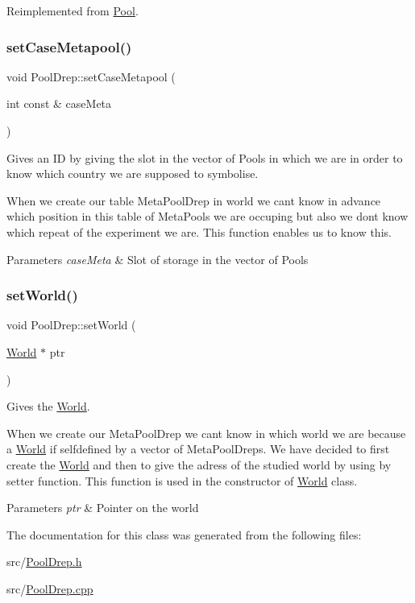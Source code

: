 Reimplemented from \hyperlink{class_pool_ad497f611cb592a6dd13f07b217bfd350}{Pool}.

\hypertarget{class_pool_drep_a64f409df1a7815bebc4744472ec7b8ce}{}\label{class_pool_drep_a64f409df1a7815bebc4744472ec7b8ce} 
\subsubsection{\texorpdfstring{set\+Case\+Metapool()}{setCaseMetapool()}}
{\footnotesize\ttfamily void Pool\+Drep\+::set\+Case\+Metapool (\begin{DoxyParamCaption}\item[{int const \&}]{case\+Meta }\end{DoxyParamCaption})}



Gives an ID by giving the slot in the vector of Pools in which we are in order to know which country we are supposed to symbolise. 

When we create our table Meta\+Pool\+Drep in world we can\textquotesingle{}t know in advance which position in this table of Meta\+Pools we are occuping but also we don\textquotesingle{}t know which repeat of the experiment we are. This function enables us to know this. 
\begin{DoxyParams}{Parameters}
{\em case\+Meta} & Slot of storage in the vector of Pools \\
\hline
\end{DoxyParams}
\hypertarget{class_pool_drep_aa957ad7c22f08cff037e3ce92fecd663}{}\label{class_pool_drep_aa957ad7c22f08cff037e3ce92fecd663} 
\subsubsection{\texorpdfstring{set\+World()}{setWorld()}}
{\footnotesize\ttfamily void Pool\+Drep\+::set\+World (\begin{DoxyParamCaption}\item[{\hyperlink{class_world}{World} $\ast$}]{ptr }\end{DoxyParamCaption})}



Gives the \hyperlink{class_world}{World}. 

When we create our Meta\+Pool\+Drep we can\textquotesingle{}t know in which world we are because a \hyperlink{class_world}{World} if selfdefined by a vector of Meta\+Pool\+Dreps. We have decided to first create the \hyperlink{class_world}{World} and then to give the adress of the studied world by using by setter function. This function is used in the constructor of \hyperlink{class_world}{World} class. 
\begin{DoxyParams}{Parameters}
{\em ptr} & Pointer on the world \\
\hline
\end{DoxyParams}


The documentation for this class was generated from the following files\+:\begin{DoxyCompactItemize}
\item 
src/\hyperlink{_pool_drep_8h}{Pool\+Drep.\+h}\item 
src/\hyperlink{_pool_drep_8cpp}{Pool\+Drep.\+cpp}\end{DoxyCompactItemize}
